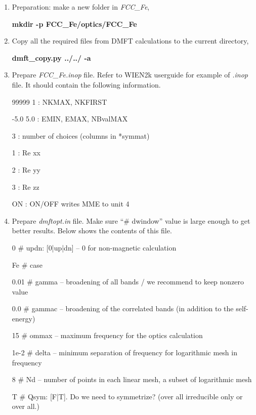 \documentclass[12 pt]{article}
\begin{document}
  \begin{enumerate}

    \item Preparation: make a new folder in \emph{FCC\_Fe},

  \textbf{mkdir -p FCC\_Fe/optics/FCC\_Fe}

    \item Copy all the required files from DMFT calculations to the current directory,

  \textbf{dmft\_copy.py ../../ -a}

    \item Prepare \emph{FCC\_Fe.inop} file. Refer to WIEN2k userguide for example of \emph{.inop} file. It should 
contain the following information.   

{\color{cyan}

99999 1      : NKMAX, NKFIRST

-5.0 5.0     : EMIN, EMAX, NBvalMAX

3            : number of choices (columns in *symmat)

1            : Re xx

2            : Re yy

3            : Re zz

ON           : ON/OFF writes MME to unit 4

}

    \item Prepare \emph{dmftopt.in} file. Make sure ``\# dwindow'' value is large enough to get better results. Below 
shows the contents of this file.

{\color{cyan}

    0          \# updn: [0|up|dn] -- 0 for non-magnetic calculation

    Fe         \# case

    0.01       \# gamma  -- broadening of all bands / we recommend to keep nonzero value

    0.0        \# gammac -- broadening of the correlated bands (in addition to the self-energy)

    15         \# ommax  -- maximum frequency for the optics calculation

    1e-2       \# delta  -- minimum separation of frequency for logarithmic mesh in frequency

    8          \# Nd     -- number of points in each linear mesh, a subset of logarithmic mesh

    T          \# Qsym: [F|T]. Do we need to symmetrize? (over all irreducible only or over all.)

}
\end{enumerate}
\end{document}
